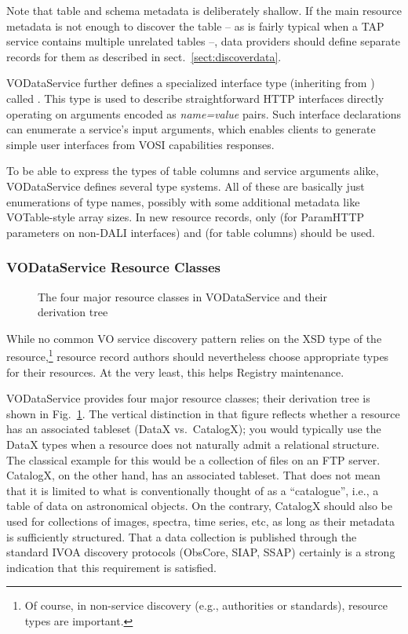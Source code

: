 \documentclass[11pt,a4paper]{ivoa}
\begin{document}
Note that table and schema metadata is deliberately shallow.  If the
main resource metadata is not enough to discover the table -- as is
fairly typical when a TAP service contains multiple unrelated tables --,
data providers should define separate records for them as described in
sect.~\ref{sect:discoverdata}.

VODataService further defines a specialized interface type
(inheriting from ) called
.  This type is used to describe
straightforward HTTP interfaces directly operating on
arguments encoded as
\emph{name=value} pairs.  Such interface declarations can
enumerate a service's input arguments, which enables clients
to generate simple
user interfaces from VOSI capabilities responses.

To be able to express the types of table columns and service arguments
alike, VODataService defines several type systems.  All of these are
basically just enumerations of type names, possibly with some additional
metadata like VOTable-style array sizes.  In new resource records, only
 (for ParamHTTP parameters on non-DALI
interfaces) and
 (for table columns) should be used.

\subsubsection{VODataService Resource Classes}
\label{sect:rescls}

\begin{figure}
\centerline{}
\caption{The four major resource classes in VODataService and their
derivation tree}
\label{fig:rescls}
\end{figure}

While no common VO service discovery pattern relies on the XSD type  of the
resource,\footnote{Of course, in non-service discovery (e.g., authorities
or standards), resource types are important.} resource
record authors should
nevertheless choose appropriate types for their resources.  At the
very least, this helps Registry maintenance.

VODataService provides four major resource classes; their derivation
tree is shown in Fig.~\ref{fig:rescls}.  The vertical distinction in
that figure reflects whether a resource has an associated tableset
(DataX vs.~CatalogX); you would typically use the DataX types when a
resource does not naturally admit a relational structure.  The classical
example for this would be a collection of files on an FTP server.  CatalogX,
on the other hand, has an associated tableset.  That does not mean that
it is limited to what is conventionally thought of as a ``catalogue'',
i.e., a table of data on astronomical objects.  On the
contrary, CatalogX should also be used for collections of images,
spectra, time series, etc, as long as their metadata is sufficiently
structured.  That a data collection is published through the standard
IVOA discovery protocols (ObsCore,
SIAP, SSAP) certainly is a strong indication that this requirement is
satisfied.
\end{document}
